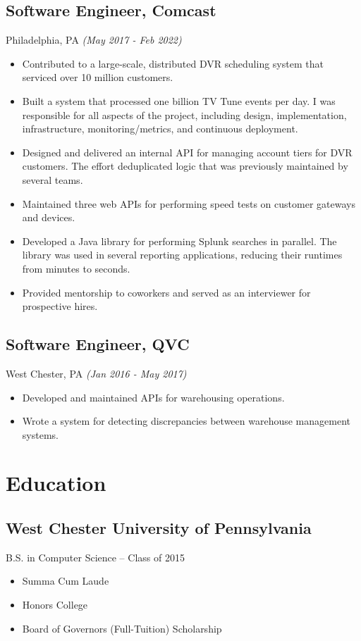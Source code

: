 \documentclass{article}
\begin{document}
\subsection*{Software Engineer, Comcast}
Philadelphia, PA \textit{(May 2017 - Feb 2022)}
\begin{itemize}[leftmargin=*]
    \item Contributed to a large-scale, distributed DVR scheduling system that serviced over 10 million customers.
    \item Built a system that processed one billion TV Tune events per day. I was responsible for all aspects of the project, including design, implementation, infrastructure, monitoring/metrics, and continuous deployment.
    \item Designed and delivered an internal API for managing account tiers for DVR customers. The effort deduplicated logic that was previously maintained by several teams.
    \item Maintained three web APIs for performing speed tests on customer gateways and devices.
    \item Developed a Java library for performing Splunk searches in parallel. The library was used in several reporting applications, reducing their runtimes from minutes to seconds.
    \item Provided mentorship to coworkers and served as an interviewer for prospective hires.
\end{itemize}

\subsection*{Software Engineer, QVC}
West Chester, PA \textit{(Jan 2016 - May 2017)}
\begin{itemize}[leftmargin=*]
    \item Developed and maintained APIs for warehousing operations.
    \item Wrote a system for detecting discrepancies between warehouse management systems.
\end{itemize}

\section*{Education}

\subsection*{West Chester University of Pennsylvania}
B.S. in Computer Science -- Class of 2015
\begin{itemize}[leftmargin=*]
    \item Summa Cum Laude
    \item Honors College
    \item Board of Governors (Full-Tuition) Scholarship
\end{itemize}
\end{document}
